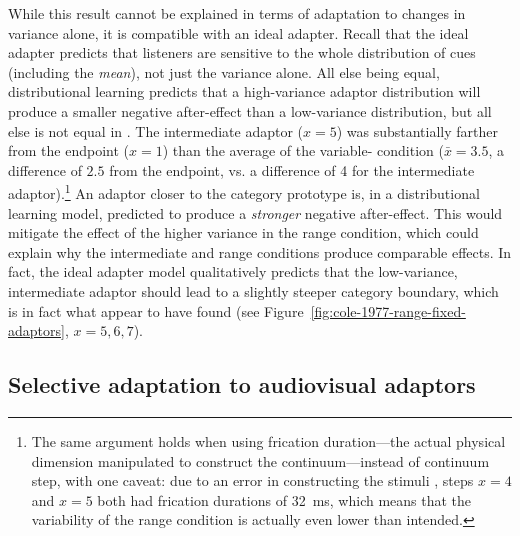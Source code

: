 \label{r2-whole-distribution-3}
While this result cannot be explained in terms of adaptation to changes in variance alone, it is compatible with an ideal adapter.  Recall that the ideal adapter predicts that listeners are sensitive to the whole distribution of cues (including the \emph{mean}), not just the variance alone.  All else being equal, distributional learning predicts that a high-variance adaptor distribution will produce a smaller negative after-effect than a low-variance distribution, but all else is not equal in \textcite{Cole1977}.  The intermediate  adaptor ($x=5$) was substantially farther from the  endpoint ($x=1$) than the average of the variable- condition ($\bar x = 3.5$, a difference of $2.5$ from the endpoint, vs. a difference of 4 for the intermediate adaptor).\footnote{The same argument holds when using frication duration---the actual physical dimension manipulated to construct the continuum---instead of continuum step, with one caveat: due to an error in constructing the stimuli \cite[Footnote 1]{Cole1977}, steps $x=4$ and $x=5$ both had frication durations of \SI{32}{\milli\second}, which means that the variability of the range condition is actually even lower than intended.}  An adaptor closer to the category prototype is, in a distributional learning model, predicted to produce a \emph{stronger} negative after-effect.  This would mitigate the effect of the higher variance in the range condition, which could explain why the intermediate and range conditions produce comparable effects.  In fact, the ideal adapter model qualitatively predicts that the low-variance, intermediate adaptor should lead to a slightly steeper category boundary, which is in fact what \textcite{Cole1977} appear to have found (see Figure~\ref{fig:cole-1977-range-fixed-adaptors}, $x=5,6,7$).


\subsection{Selective adaptation to audiovisual adaptors}
\label{sec:select-adapt-audi}

